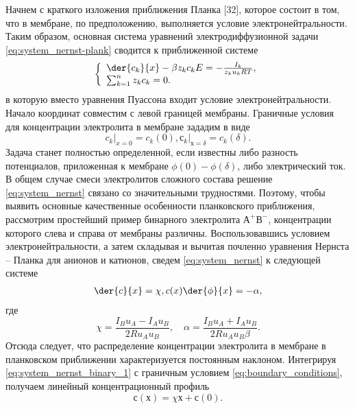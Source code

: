 Начнем с краткого изложения приближения Планка [32], которое состоит в том, что
в мембране, по предположению, выполняется условие электронейтральности. Таким
образом, основная система уравнений электродиффузионной задачи
\eqref{eq:system_nernst-plank} сводится к приближенной системе
\begin{equation}
\left\{
    \begin{array}{l}
        \der{c_k}{x} - \beta z_k c_k E = - \frac{I_k}{z_k u_k RT},\\
        \sum_{k=1}^n z_k c_k = 0.
    \end{array}
\right.
\label{eq:system_nernst}
\end{equation}
в которую вместо уравнения Пуассона входит условие электронейтральности. Начало
координат совместим с левой границей мембраны. Граничные условия для
концентрации электролита в мембране зададим в виде
\begin{equation}
    \left.c_k\right|_{x=0} = c_k(0), \left.с_k\right|_{х=\delta} = c_k(\delta).
    \label{eq:boundary_conditions}
\end{equation}
Задача станет полностью определенной, если известны либо разность потенциалов,
приложенная к мембране \( \phi(0) - \phi(\delta) \), либо электрический ток.
В общем случае смеси электролитов сложного состава решение
\eqref{eq:system_nernst} связано со значительными трудностями. Поэтому, чтобы
выявить основные качественные особенности планковского приближения, рассмотрим
простейший пример бинарного электролита \( А^+В^- \), концентрации которого
слева и справа от мембраны различны. Воспользовавшись условием
электронейтральности, а затем складывая и вычитая почленно уравнения
Нернста -- Планка для анионов и катионов, сведем \eqref{eq:system_nernst} к
следующей системе
\begin{align}
    \der{c}{x} = \chi,              \label{eq:system_nernst_binary_1}
    c(x)\der{\phi}{x} = -\alpha,    \label{eq:system_nernst_binary_2}
\end{align}
где
\begin{equation}
    \chi = \frac{I_B u_A - I_A u_B}{2Ru_Au_B},\quad
    \alpha = \frac{I_B u_A + I_A u_B}{2Ru_Au_B\beta}.
    \label{eq:system_nernst_binary_subs}
\end{equation}
Отсюда следует, что распределение концентрации электролита в мембране в
планковском приближении характеризуется постоянным наклоном. Интегрируя
\eqref{eq:system_nernst_binary_1} с граничным условием
\eqref{eq:boundary_conditions}, получаем линейный концентрационный профиль
\begin{equation}
    с (х) = \chi х + с(0).
    \label{eq:nernst_binary_conc}
\end{equation}
